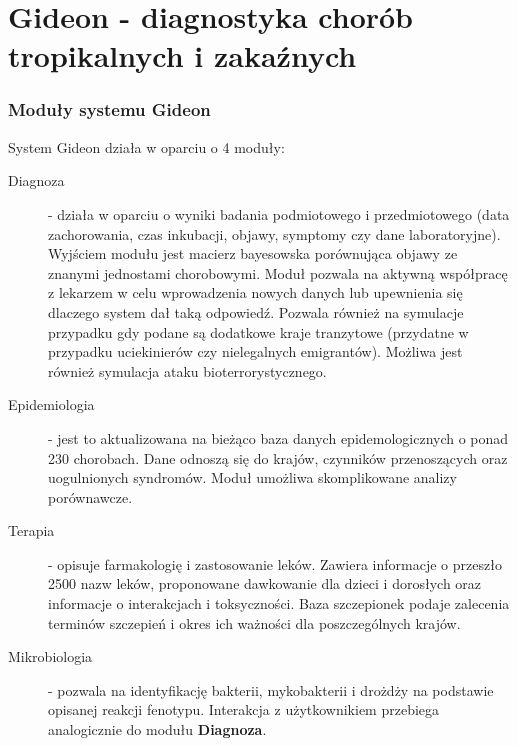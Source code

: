\section{Gideon - diagnostyka chorób tropikalnych i zakaźnych}


\begin{frame}[allowframebreaks]
 \frametitle{Moduły systemu Gideon}

System Gideon działa w oparciu o 4 moduły:

\begin{description}
 \item[Diagnoza] - działa w oparciu o wyniki badania podmiotowego i przedmiotowego
 (data zachorowania, czas inkubacji, objawy, symptomy czy dane laboratoryjne).
 Wyjściem modułu jest macierz bayesowska porównująca objawy ze znanymi
 jednostami chorobowymi. Moduł pozwala na aktywną współpracę z lekarzem w celu
 wprowadzenia nowych danych lub upewnienia się dlaczego system dał taką
 odpowiedź. Pozwala również na symulacje przypadku gdy podane są dodatkowe
 kraje tranzytowe (przydatne w przypadku uciekinierów czy nielegalnych
 emigrantów). Możliwa jest również symulacja ataku bioterrorystycznego.
 \framebreak
 \item[Epidemiologia] - jest to aktualizowana na bieżąco baza danych
 epidemologicznych o ponad 230 chorobach. Dane odnoszą się do krajów, czynników
 przenoszących oraz uogulnionych syndromów. Moduł umożliwa skomplikowane
 analizy porównawcze.
 \item[Terapia] - opisuje farmakologię i zastosowanie leków. Zawiera informacje
 o przeszło 2500 nazw leków, proponowane dawkowanie dla dzieci i dorosłych oraz
 informacje o interakcjach i toksyczności. Baza szczepionek podaje zalecenia
 terminów szczepień i okres ich ważności dla poszczególnych krajów.
 \framebreak
 \item[Mikrobiologia] - pozwala na identyfikację bakterii, mykobakterii i
 drożdży na podstawie opisanej reakcji fenotypu. Interakcja z użytkownikiem
 przebiega analogicznie do modułu \textbf{Diagnoza}.
 

 \end{description}

\end{frame}


